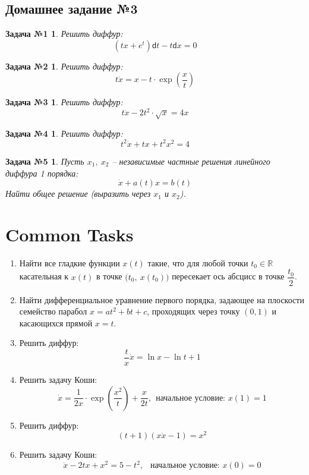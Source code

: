 \documentclass[a4paper,12pt]{article}
\newtheorem*{task1}{Задача №1}
\newtheorem*{task2}{Задача №2}
\newtheorem*{task3}{Задача №3}
\newtheorem*{task4}{Задача №4}
\newtheorem*{task5}{Задача №5}
\newcommand{\R}{\mathbb{R}}
\renewcommand{\d}{\mathsf{d}}
\newcommand{\dx}{\dot{x}}
\begin{document}

\subsection{Домашнее задание №3}

\begin{task1}
Решить диффур:
\[(tx + e^t)\d t - t\d x = 0\]
\end{task1}
%

\begin{task2}
Решить диффур:
\[t\dx = x - t\cdot \exp(\dfrac{x}{t})\]
\end{task2}

\begin{task3}
Решить диффур:
\[t\dx - 2t^2\cdot \sqrt{x} = 4x\]
\end{task3}
%	

\begin{task4}
Решить диффур:
\[t^2\dx + tx + t^2x^2 = 4\]
\end{task4}
%

\begin{task5}
Пусть $x_1,\ x_2$ -- независимые  частные решения линейного диффура 1 порядка:
\[\dx + a(t)x = b(t)\]
Найти общее решение (выразить через $x_1$ и $x_2$).
\end{task5}
%	

\newpage
\section{Common Tasks}

\begin{enumerate}
	\item Найти все гладкие функции $x(t)$ такие, что для любой точки $t_0 \in \R$ касательная к $x(t)$ в точке $\big(t_0,\ x(t_0)\big)$ пересекает ось абсцисс в точке $\dfrac{t_0}{2}$.
	\item Найти дифференциальное уравнение первого порядка, задающее на плоскости семейство парабол
	$x = at^2 + bt + c$, проходящих через 
	точку $(0,1)$ и касающихся прямой $x = t$. 
	\item Решить диффур: \[\dfrac{t}{x}\dx = \ln x - \ln t + 1\]
	\item Решить задачу Коши:
	\[	\dx = \dfrac{1}{2x}\cdot \exp(\frac{x^2}{t}) + \dfrac{x}{2t},\ \ 	\text{начальное условие: }x(1) = 1\]
	\item Решить диффур: \[(t + 1)(x\dx - 1) = x^2\]
	\item Решить задачу Коши: \[\dx - 2tx + x^2 = 5 - t^2,\ \ \text{ начальное условие: }x(0) = 0\]
\end{enumerate}
\end{document}
